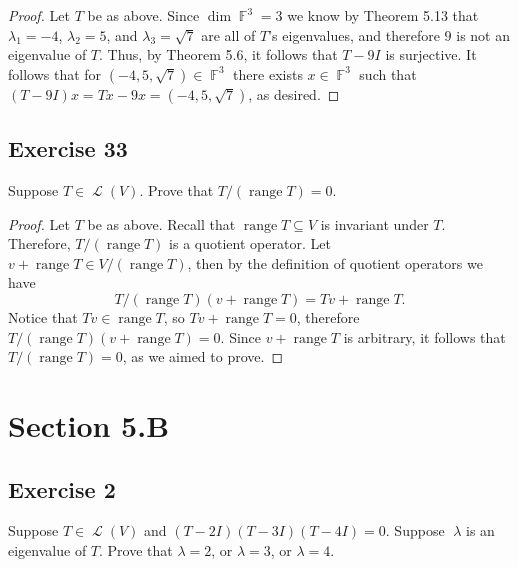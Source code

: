 \documentclass[letterpaper, 12pt]{amsart}
\DeclareMathOperator{\F}{\mathbb{F}}				%
\DeclareMathOperator{\Ell}{\mathscr{L}}				%
\DeclareMathOperator{\range}{\text{range }}			%
\theoremstyle{definition}  							%
\begin{document}
		\begin{proof}
		Let $T$ be as above.
		Since $\dim \F^{3} = 3$ we know by Theorem 5.13 that $\lambda_{1} = -4$, $\lambda_{2} = 5$, and $\lambda_{3} = \sqrt{7}$ are all of $T$'s eigenvalues, and therefore $9$ is not an eigenvalue of $T$.
		Thus, by Theorem 5.6, it follows that $T - 9I$ is surjective.
		It follows that for $(-4, 5, \sqrt{7}) \in \F^3$ there exists $x \in \F^3$ such that $(T-9I)x = Tx - 9x = (-4, 5, \sqrt{7})$, as desired.
		\end{proof}

		\subsection*{Exercise 33}
		Suppose $T \in \Ell(V)$.
		Prove that $T/(\range T) = 0$.

		\begin{proof}
		Let $T$ be as above.
		Recall that $\range T \subseteq V$ is invariant under $T$.
		Therefore, $T/(\range T)$ is a quotient operator.
		Let $v + \range T \in V/(\range T)$, then by the definition of quotient operators we have $$T/(\range T)(v + \range T) = Tv + \range T.$$
		Notice that $Tv \in \range T$, so $Tv + \range T = 0$, therefore $T/(\range T)(v + \range T) = 0$.
		Since $v + \range T$ is arbitrary, it follows that $T/(\range T) = 0$, as we aimed to prove.
		\end{proof}

	\section*{Section 5.B}
		\subsection*{Exercise 2}
		Suppose $T \in \Ell(V)$ and $(T - 2I)(T - 3I)(T - 4I) = 0$.
		Suppose􏰀 $\lambda$ is an eigenvalue of $T$. 
		Prove that $\lambda = 2$, or $\lambda = 3$, or $\lambda = 4$.
\end{document}
